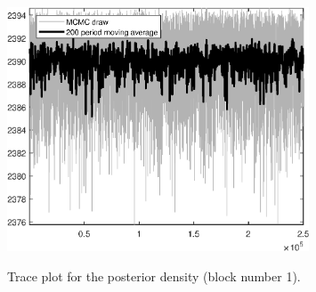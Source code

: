 \begin{figure}[H]
\centering
  \includegraphics[width=0.8\textwidth]{BRS_growth_ext_comovement/graphs/TracePlot_Posterior_blck_1}\\
    \caption{Trace plot for the posterior density (block number 1).}
\end{figure}
